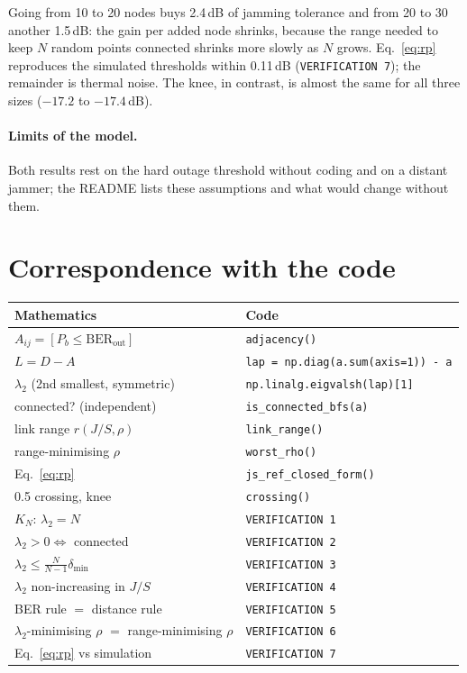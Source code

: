 \documentclass[11pt,a4paper]{article}
\newcommand{\BERout}{\mathrm{BER}_{\mathrm{out}}}
\begin{document}
Going from 10 to 20 nodes buys 2.4\,dB of jamming tolerance and from 20 to 30
another 1.5\,dB: the gain per added node shrinks, because the range needed to
keep $N$ random points connected shrinks more slowly as $N$ grows.
Eq.~\eqref{eq:rp} reproduces the simulated thresholds within 0.11\,dB
(\texttt{VERIFICATION 7}); the remainder is thermal noise. The knee, in
contrast, is almost the same for all three sizes ($-17.2$ to $-17.4$\,dB).

\paragraph{Limits of the model.}
Both results rest on the hard outage threshold without coding and on a distant
jammer; the README lists these assumptions and what would change without them.

\section{Correspondence with the code}
\begin{center}
\begin{tabular}{@{}ll@{}}
\toprule
Mathematics & Code \\
\midrule
$A_{ij} = [P_b\le\BERout]$ & \texttt{adjacency()} \\
$L = D - A$ & \texttt{lap = np.diag(a.sum(axis=1)) - a} \\
$\lambda_2$ (2nd smallest, symmetric) & \texttt{np.linalg.eigvalsh(lap)[1]} \\
connected? (independent) & \texttt{is\_connected\_bfs(a)} \\
link range $r(J/S,\rho)$ & \texttt{link\_range()} \\
range-minimising $\rho$ & \texttt{worst\_rho()} \\
Eq.~\eqref{eq:rp} & \texttt{js\_ref\_closed\_form()} \\
0.5 crossing, knee & \texttt{crossing()} \\
$K_N$: $\lambda_2 = N$ & \texttt{VERIFICATION 1} \\
$\lambda_2>0\iff$ connected & \texttt{VERIFICATION 2} \\
$\lambda_2\le\frac{N}{N-1}\delta_{\min}$ & \texttt{VERIFICATION 3} \\
$\lambda_2$ non-increasing in $J/S$ & \texttt{VERIFICATION 4} \\
BER rule $=$ distance rule & \texttt{VERIFICATION 5} \\
$\lambda_2$-minimising $\rho$ $=$ range-minimising $\rho$ & \texttt{VERIFICATION 6} \\
Eq.~\eqref{eq:rp} vs simulation & \texttt{VERIFICATION 7} \\
\bottomrule
\end{tabular}
\end{center}
\end{document}
